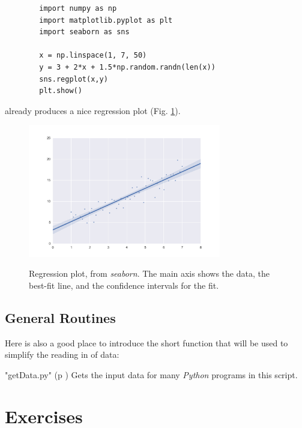 \begin{lstlisting}
        import numpy as np
        import matplotlib.pyplot as plt
        import seaborn as sns

        x = np.linspace(1, 7, 50)
        y = 3 + 2*x + 1.5*np.random.randn(len(x))
        sns.regplot(x,y)
        plt.show()
\end{lstlisting}

already produces a nice regression plot (Fig. \ref{fig:seaborn}).

\begin{figure}[ht]
  \centering
  \includegraphics[width=0.75\textwidth]{../Images/regplot.png}\\
  \caption{Regression plot, from \emph{seaborn}. The main axis shows the data, the best-fit line, and the confidence intervals for the fit.}
  \label{fig:seaborn}
\end{figure}

\subsection{General Routines}
Here is also a good place to introduce the short function that will be used to simplify the reading in of data:

\PyImg "getData.py" (p \pageref{py:getData}) Gets the input data for many \emph{Python} programs in this script.

\section{Exercises}

